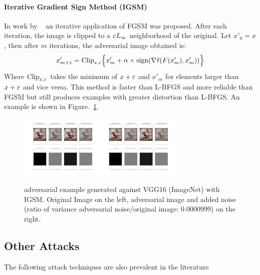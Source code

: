 \paragraph{Iterative Gradient Sign Method (IGSM)}
\label{igsm-s}
In work by ~\citet{kurakin_adversarial_2016}
  an iterative application of FGSM was proposed. After each
  iteration, the image is clipped to a $\varepsilon L_\infty$ neighborhood of the original. Let $x'_0 = x$, then after $m$ iterations, the adversarial image obtained is:
\begin{equation}
x_{m+1}' = \text{Clip}_{x,\epsilon} \Bigl\{x_m' + \alpha \times \text{sign}(\nabla \ell (F(x'_m),x'_m))  \Bigr\} 
\label{igsm}
\end{equation}
Where $\text{Clip}_{x,\varepsilon}$ takes the minimum of $x+\varepsilon$ and $x'_m$ for
elements larger than $x+\varepsilon$ and vice versa. 
This method is faster than L-BFGS and more reliable than FGSM but
still produces examples with greater distortion than L-BFGS. An
example is shown in Figure.~\ref{fgsmhip}.  
\begin{figure}[ht]
  \centering
\includegraphics[trim=200 110 1200 102, clip,width=4cm]{c1_figures/ILSVRC2012_val_00002900summary_plot.png}\includegraphics[trim=900 110 500 102, clip,width=4cm]{c1_figures/ILSVRC2012_val_00002900summary_plot.png}
\caption{adversarial example generated against VGG16 (ImageNet) with IGSM. Original Image on the left, adversarial image and added noise (ratio of variance adversarial noise/original image: 0.0000999) on the right. }
\label{fgsmhip}
\end{figure}

\subsection{Other Attacks}
The following attack techniques are also prevalent in the literature 

